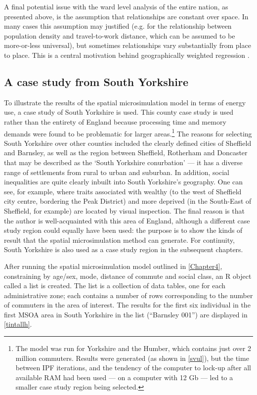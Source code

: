 \documentclass[a4paper, 11pt, twoside]{Thesis}
\begin{document}
A final potential issue with the ward level analysis of the entire nation, as presented
above, is the assumption that relationships are constant over space.
In many cases this assumption may justified (e.g. for the relationship between
population density and travel-to-work distance, which can be assumed to be
more-or-less universal), but sometimes relationships vary
substantially from place to place. This is a central motivation behind
geographically weighted regression \citep{Fotheringham2002}.

\subsection{A case study from South Yorkshire} \label{soyoref}
To illustrate the results of the spatial microsimulation model
in terms of energy use, a case study of South Yorkshire is used.
This county case study is used rather than the entirety of England because
processing time and memory demands were found to be problematic for
larger areas.\footnote{The
model was run for
Yorkshire and the Humber, which contains just over 2 million commuters.
Results were generated (as shown in \cref{svul}), but the time between
IPF iterations, and the tendency of the computer to lock-up after all
available RAM had been used --- on a computer with 12 Gb ---
led to a smaller case study region being selected.
}
The reasons for selecting South Yorkshire over other counties included the
clearly defined cities of Sheffield and Barnsley, as well as the region
between Sheffield, Rotherham and Doncaster that may be described as
the `South Yorkshire conurbation' \citep{barker1978perthes} --- it has
a diverse range of settlements from rural to urban and suburban.
In addition, social inequalities are quite clearly inbuilt into South Yorkshire's
geography. One can see, for example, where traits associated
with wealthy (to the west of Sheffield city centre, bordering
the Peak District) and more deprived (in the South-East of Sheffield,
for example) are located by visual inspection. The final reason
is that the author is well-acquainted with this area of England,
although a different case study region could equally have been used:
the purpose is to show the kinds of result that the
spatial microsimulation method can generate.
For continuity, 
South Yorkshire is also used as a case study region in the subsequent chapters.

After running the spatial microsimulation model outlined in
\cref{Chapter4}, constraining by age/sex, mode, distance of commute and
social class, an R object called a list is created. The list is a collection
of data tables, one for each administrative zone; each contains a number of
rows corresponding to the number of commuters in the area of interest.
The results for the first six individual in the first MSOA area
in South Yorkshire in the list (``Barnsley 001'') are displayed in
\cref{tintallh}.
\end{document}
